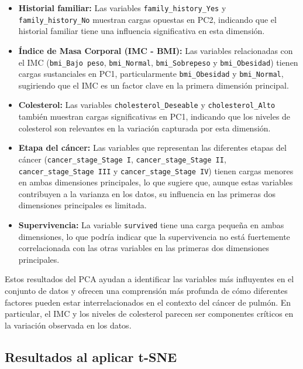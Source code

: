 \documentclass[10pt,journal,compsoc]{IEEEtran}
\begin{document}
\begin{itemize}

    \item \textbf{Historial familiar:} Las variables \texttt{family\_history\_Yes} y \texttt{family\_history\_No} muestran cargas opuestas en PC2, indicando que el historial familiar tiene una influencia significativa en esta dimensión.

    \item \textbf{Índice de Masa Corporal (IMC - BMI):} Las variables relacionadas con el IMC (\texttt{bmi\_Bajo peso}, \texttt{bmi\_Normal}, \texttt{bmi\_Sobrepeso} y \texttt{bmi\_Obesidad}) tienen cargas sustanciales en PC1, particularmente \texttt{bmi\_Obesidad} y \texttt{bmi\_Normal}, sugiriendo que el IMC es un factor clave en la primera dimensión principal.

    \item \textbf{Colesterol:} Las variables \texttt{cholesterol\_Deseable} y \texttt{cholesterol\_Alto} también muestran cargas significativas en PC1, indicando que los niveles de colesterol son relevantes en la variación capturada por esta dimensión.

    \item \textbf{Etapa del cáncer:} Las variables que representan las diferentes etapas del cáncer (\texttt{cancer\_stage\_Stage I}, \texttt{cancer\_stage\_Stage II}, \texttt{cancer\_stage\_Stage III} y \texttt{cancer\_stage\_Stage IV}) tienen cargas menores en ambas dimensiones principales, lo que sugiere que, aunque estas variables contribuyen a la varianza en los datos, su influencia en las primeras dos dimensiones principales es limitada.

    \item \textbf{Supervivencia:} La variable \texttt{survived} tiene una carga pequeña en ambas dimensiones, lo que podría indicar que la supervivencia no está fuertemente correlacionada con las otras variables en las primeras dos dimensiones principales.
\end{itemize}

Estos resultados del PCA ayudan a identificar las variables más influyentes en el conjunto de datos y ofrecen una comprensión más profunda de cómo diferentes factores pueden estar interrelacionados en el contexto del cáncer de pulmón. En particular, el IMC y los niveles de colesterol parecen ser componentes críticos en la variación observada en los datos.


\subsection{Resultados al aplicar t-SNE}
\end{document}
